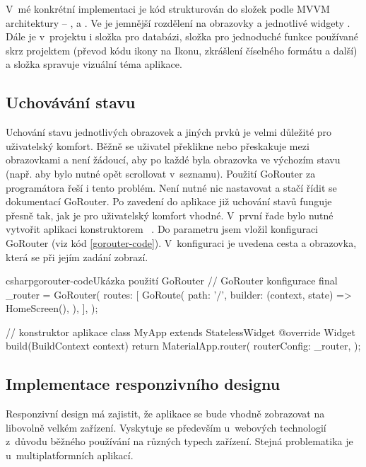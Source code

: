 \documentclass[
  biblatex,
  figures=true,
  tables=false,
  glossaries,
  index
]{kidiplom}
\begin{document}
V~mé konkrétní implementaci je kód strukturován do složek podle MVVM architektury -- ,  a . Ve  je jemnější rozdělení na obrazovky  a jednotlivé widgety . Dále je v~projektu i složka  pro databázi, složka  pro jednoduché funkce používané skrz projektem (převod kódu ikony na Ikonu, zkrášlení číselného formátu a další) a složka  spravuje vizuální téma aplikace.

\subsection{Uchovávání stavu}
Uchování stavu jednotlivých obrazovek a jiných prvků je velmi důležité pro uživatelský komfort. Běžně se uživatel překlikne nebo přeskakuje mezi obrazovkami a není žádoucí, aby po každé byla obrazovka ve výchozím stavu (např. aby bylo nutné opět scrollovat v~seznamu). Použití GoRouter za programátora řeší i tento problém. Není nutné nic nastavovat a stačí řídit se dokumentací GoRouter. Po zavedení do aplikace již uchování stavů funguje přesně tak, jak je pro uživatelský komfort vhodné. V~první řade bylo nutné vytvořit aplikaci konstruktorem ~. Do parametru  jsem vložil konfiguraci GoRouter (viz kód \ref{gorouter-code}). V~konfiguraci je uvedena cesta a obrazovka, která se při jejím zadání zobrazí.

\begin{kicode}{csharp}{gorouter-code}{Ukázka použití GoRouter}
  // GoRouter konfigurace
  final _router = GoRouter(
    routes: [
      GoRoute(
        path: '/',
        builder: (context, state) => HomeScreen(),
      ),
    ],
  );

  // konstruktor aplikace
  class MyApp extends StatelessWidget {
    @override
    Widget build(BuildContext context) {
      return MaterialApp.router(
        routerConfig: _router,
      );
    }
  }
\end{kicode}

\subsection{Implementace responzivního designu}
Responzivní design má zajistit, že aplikace se bude vhodně zobrazovat na libovolně velkém zařízení. Vyskytuje se především u~webových technologií z~důvodu běžného používání na různých typech zařízení. Stejná problematika je u~multiplatformních aplikací.
\end{document}
